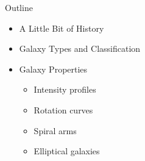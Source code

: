 \documentclass[letterpaper,landscape]{slides}
\begin{document}

\begin{slide}
\begin{center}
{\large \color{red} 
                         Outline
}
\end{center}

\begin{itemize}
\item {\color{blue} A Little Bit of History}
\item {\color{blue} Galaxy Types and Classification}
\item {\color{blue} Galaxy Properties}
\begin{itemize}
\item Intensity profiles
\item Rotation curves 
\item Spiral arms 
\item Elliptical galaxies 
\end{itemize}          
\end{itemize}          

\vfill
\end{slide}


\end{document}
